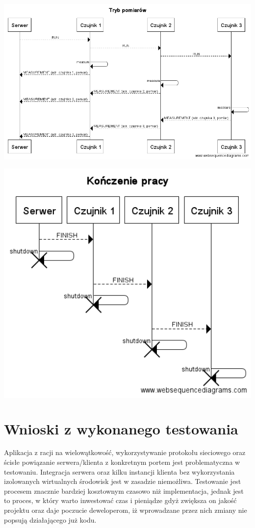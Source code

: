 \documentclass[a4paper,11pt]{article}
\begin{document}
\begin{center}
    \centerline{\includegraphics[width=1.4\textwidth]{measure_seq}}
    \centerline{\includegraphics[width=1.0\textwidth]{finish_seq}}
\end{center}

\section{Wnioski z wykonanego testowania}
Aplikacja z racji na wielowątkowość, wykorzystywanie protokołu sieciowego oraz ścisłe powiązanie serwera/klienta z konkretnym portem jest problematyczna w testowaniu. Integracja serwera oraz kilku instancji klienta bez wykorzystania izolowanych wirtualnych środowisk jest w zasadzie niemożliwa. Testowanie jest procesem znacznie bardziej kosztownym czasowo niż implementacja, jednak jest to proces, w który warto inwestować czas i pieniądze gdyż zwiększa on jakość projektu oraz daje poczucie deweloperom, iż wprowadzane przez nich zmiany nie popsują działającego już kodu.
\end{document}
